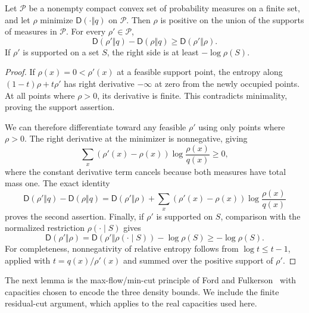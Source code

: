 \begin{lemma}\label{lem:entropy-support}
Let \(\mathcal P\) be a nonempty compact convex set of probability measures on a finite set, and let \(\rho\) minimize \(\mathsf D(\cdot\Vert q)\) on \(\mathcal P\).
Then \(\rho\) is positive on the union of the supports of measures in \(\mathcal P\).
For every \(\rho'\in\mathcal P\),
\[
 \mathsf D(\rho'\Vert q)-\mathsf D(\rho\Vert q)
 \ge \mathsf D(\rho'\Vert\rho).
\]
If \(\rho'\) is supported on a set \(S\), the right side is at least \(-\log\rho(S)\).
\end{lemma}
\begin{proof}
If \(\rho(x)=0<\rho'(x)\) at a feasible support point, the entropy along
\((1-t)\rho+t\rho'\) has right derivative \(-\infty\) at zero from the newly occupied points.
At all points where \(\rho>0\), its derivative is finite.
This contradicts minimality, proving the support assertion.

We can therefore differentiate toward any feasible \(\rho'\) using only points where \(\rho>0\).
The right derivative at the minimizer is nonnegative, giving
\[
 \sum_x(\rho'(x)-\rho(x))\log\frac{\rho(x)}{q(x)}\ge0,
\]
where the constant derivative term cancels because both measures have total mass one.
The exact identity
\[
 \mathsf D(\rho'\Vert q)-\mathsf D(\rho\Vert q)
 =\mathsf D(\rho'\Vert\rho)
  +\sum_x(\rho'(x)-\rho(x))\log\frac{\rho(x)}{q(x)}
\]
proves the second assertion.
Finally, if \(\rho'\) is supported on \(S\), comparison with the normalized restriction \(\rho(\cdot\mid S)\) gives
\[
 \mathsf D(\rho'\Vert\rho)
 =\mathsf D(\rho'\Vert\rho(\cdot\mid S))-\log\rho(S)
 \ge-\log\rho(S).
\]
For completeness, nonnegativity of relative entropy follows from
\(\log t\le t-1\), applied with \(t=q(x)/\rho'(x)\) and summed over the positive support of \(\rho'\).
\end{proof}

The next lemma is the max-flow/min-cut principle of
Ford and Fulkerson~\citep{fordfulkerson1956} with capacities chosen
to encode the three density bounds. We include the finite residual-cut
argument, which applies to the real capacities used here.

